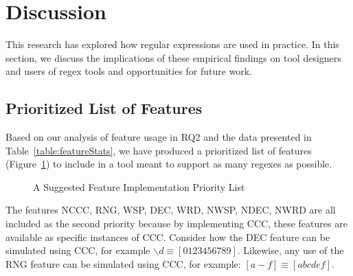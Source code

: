 \section{Discussion}
\label{sec:discussion}

This research has explored how regular expressions are used in practice. In this section, we discuss the implications of these empirical findings on tool designers and users of regex tools and opportunities for future work.

\subsection{Prioritized List of Features}
\label{sec:prioritizedList}
Based on our analysis of feature usage in RQ2 and the data presented in Table~\ref{table:featureStats}, we have produced a prioritized list of features (Figure~\ref{fig:prioritizedList}) to include in a tool meant to support as many regexes as possible.

\begin{figure}[tb]
\caption{A Suggested Feature Implementation Priority List \label{fig:prioritizedList}
}
\end{figure}

The features NCCC, RNG, WSP, DEC, WRD, NWSP, NDEC, NWRD are all included as the second priority because by implementing CCC, these features are available as specific instances of CCC.  Consider how the DEC feature can be simulated using CCC, for example  $\backslash d \equiv [0123456789]$. Likewise, any use of the RNG feature can be simulated using CCC, for example: $[a-f] \equiv [abcdef]$.

